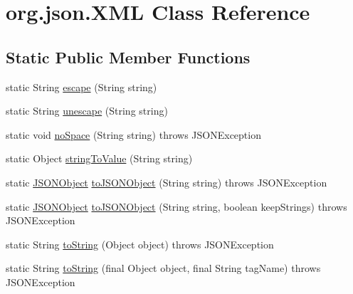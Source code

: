 \hypertarget{classorg_1_1json_1_1XML}{\section{org.\-json.\-X\-M\-L Class Reference}
\label{classorg_1_1json_1_1XML}
}
\subsection*{Static Public Member Functions}
\begin{DoxyCompactItemize}
\item 
static String \hyperlink{classorg_1_1json_1_1XML_ac7d1541b807c9c09526495fa16ab0d75}{escape} (String string)
\item 
static String \hyperlink{classorg_1_1json_1_1XML_a3779686c76836cb761d6250f846cd5d6}{unescape} (String string)
\item 
static void \hyperlink{classorg_1_1json_1_1XML_a433875e54b5e562f14878e3e51b0caf4}{no\-Space} (String string)  throws J\-S\-O\-N\-Exception 
\item 
static Object \hyperlink{classorg_1_1json_1_1XML_ab49caaac2a830d8aa44ab26382c318f6}{string\-To\-Value} (String string)
\item 
static \hyperlink{classorg_1_1json_1_1JSONObject}{J\-S\-O\-N\-Object} \hyperlink{classorg_1_1json_1_1XML_a31c7e87a06107fc3ec5c9a3eba318d18}{to\-J\-S\-O\-N\-Object} (String string)  throws J\-S\-O\-N\-Exception 
\item 
static \hyperlink{classorg_1_1json_1_1JSONObject}{J\-S\-O\-N\-Object} \hyperlink{classorg_1_1json_1_1XML_adc7fcc544f604a5b55148bf3a042042c}{to\-J\-S\-O\-N\-Object} (String string, boolean keep\-Strings)  throws J\-S\-O\-N\-Exception 
\item 
static String \hyperlink{classorg_1_1json_1_1XML_a4d4cd79a68a991f50707b87a7a23d02b}{to\-String} (Object object)  throws J\-S\-O\-N\-Exception 
\item 
static String \hyperlink{classorg_1_1json_1_1XML_a063dd278b1f6a2167ac57d8226c899b0}{to\-String} (final Object object, final String tag\-Name)  throws J\-S\-O\-N\-Exception 
\end{DoxyCompactItemize}
